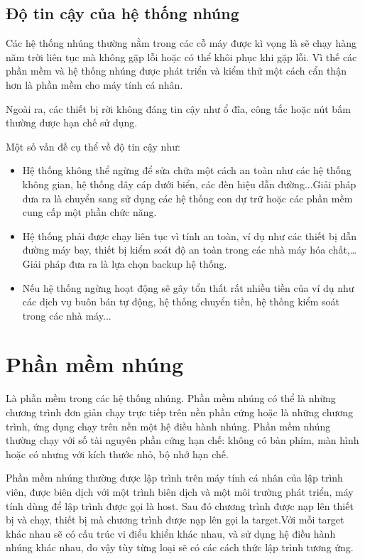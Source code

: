         \subsection{Độ tin cậy của hệ thống nhúng}
Các hệ thống nhúng thường nằm trong các cỗ máy được kì vọng là sẽ chạy hàng năm trời liên tục mà không gặp lỗi hoặc có thể khôi phục khi gặp lỗi. Vì thế các phần mềm và hệ thống nhúng được phát triển và kiểm thử một cách cẩn thận hơn là phần mềm cho máy tính cá nhân.

Ngoài ra, các thiết bị rời không đáng tin cậy như ổ đĩa, công tắc hoặc nút bấm thường được hạn chế sử dụng.

Một số vấn đề cụ thể về độ tin cậy như:
            \begin{itemize}
                \item Hệ thống không thể ngừng để sửa chữa một cách an toàn như  các hệ thống không gian, hệ thống dây cáp dưới biển, các đèn hiệu dẫn đường...Giải pháp đưa ra là  chuyển sang sử dụng các hệ thống con dự trữ hoặc các phần mềm cung cấp một phần chức năng.
                \item Hệ thống phải được chạy liên tục vì tính an toàn, ví dụ như các thiết bị dẫn đường máy bay, thiết bị kiểm soát độ an toàn trong các nhà máy hóa chất,… Giải pháp đưa ra là lựa chọn backup hệ thống.
                \item Nếu hệ thống ngừng hoạt động sẽ gây tổn thất rất nhiều tiền của ví dụ như các dịch vụ buôn bán tự động, hệ thống chuyển tiền, hệ thống kiểm soát trong các nhà máy...
            \end{itemize}

    \section{Phần mềm nhúng}

Là phần mềm trong các hệ thống nhúng. Phần mềm nhúng có thể là những chương trình đơn giản chạy trực tiếp trên nền phần cứng hoặc là những chương trình, ứng dụng chạy trên nền một hệ điều hành nhúng. Phần mềm nhúng thường chạy với số tài nguyên phần cứng hạn chế: không có bàn phím, màn hình hoặc có nhưng với kích thước nhỏ, bộ nhớ hạn chế.

Phần mềm nhúng thường được lập trình trên máy tính cá nhân của lập trình viên, được biên dịch với một trình biên dịch và một môi trường phát triển, máy tính dùng để lập trình được gọi là host. Sau đó chương trình được nạp lên thiết bị và chạy, thiết bị mà chương trình được nạp lên gọi la target.Với mỗi target khác nhau sẽ có cấu trúc vi điểu khiển khác nhau, và sử dụng hệ điều hành nhúng khác nhau, do vậy tùy từng loại sẽ có các cách thức lập trình tương ứng.

